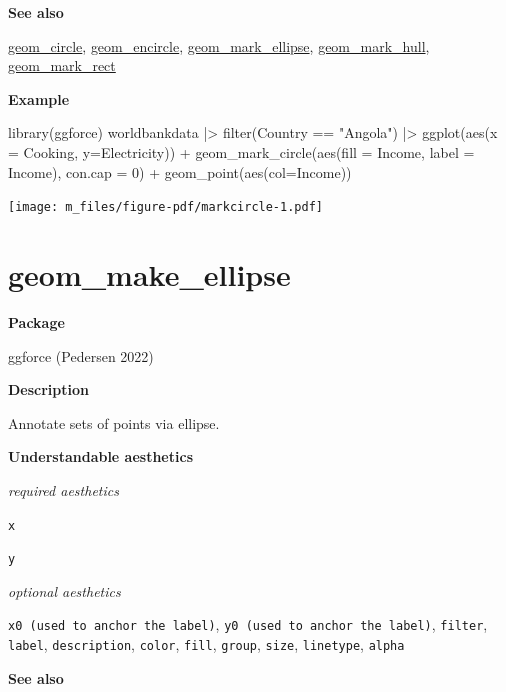 \documentclass[
  letterpaper,
  DIV=11,
  numbers=noendperiod]{scrreprt}
\newenvironment{Shaded}{\begin{snugshade}}{\end{snugshade}}
\newcommand{\AttributeTok}[1]{\textcolor[rgb]{0.40,0.45,0.13}{#1}}
\newcommand{\DecValTok}[1]{\textcolor[rgb]{0.68,0.00,0.00}{#1}}
\newcommand{\FunctionTok}[1]{\textcolor[rgb]{0.28,0.35,0.67}{#1}}
\newcommand{\NormalTok}[1]{\textcolor[rgb]{0.00,0.23,0.31}{#1}}
\newcommand{\SpecialCharTok}[1]{\textcolor[rgb]{0.37,0.37,0.37}{#1}}
\newcommand{\StringTok}[1]{\textcolor[rgb]{0.13,0.47,0.30}{#1}}
\begin{document}
\textbf{See also}

\hyperref[circle]{geom\_circle}, \hyperref[encircle]{geom\_encircle},
\hyperref[mark_ellipse]{geom\_mark\_ellipse},
\hyperref[mark_hill]{geom\_mark\_hull},
\hyperref[mark_rect]{geom\_mark\_rect}

\textbf{Example}

\begin{Shaded}
\begin{Highlighting}[]
\FunctionTok{library}\NormalTok{(ggforce)}
\NormalTok{worldbankdata }\SpecialCharTok{|\textgreater{}}
  \FunctionTok{filter}\NormalTok{(Country }\SpecialCharTok{==} \StringTok{"Angola"}\NormalTok{) }\SpecialCharTok{|\textgreater{}}
  \FunctionTok{ggplot}\NormalTok{(}\FunctionTok{aes}\NormalTok{(}\AttributeTok{x =}\NormalTok{ Cooking, }\AttributeTok{y=}\NormalTok{Electricity)) }\SpecialCharTok{+}
  \FunctionTok{geom\_mark\_circle}\NormalTok{(}\FunctionTok{aes}\NormalTok{(}\AttributeTok{fill =}\NormalTok{ Income, }\AttributeTok{label =}\NormalTok{ Income),}
                   \AttributeTok{con.cap =} \DecValTok{0}\NormalTok{) }\SpecialCharTok{+}
  \FunctionTok{geom\_point}\NormalTok{(}\FunctionTok{aes}\NormalTok{(}\AttributeTok{col=}\NormalTok{Income))}
\end{Highlighting}
\end{Shaded}

\texttt{[image: m\_files/figure-pdf/markcircle-1.pdf]}

\section{geom\_make\_ellipse}\label{mark_ellipse}

\textbf{Package}

ggforce (Pedersen 2022)

\textbf{Description}

Annotate sets of points via ellipse.

\textbf{Understandable aesthetics}

\emph{required aesthetics}

\texttt{x}

\texttt{y}

\emph{optional aesthetics}

\texttt{x0\ (used\ to\ anchor\ the\ label)},
\texttt{y0\ (used\ to\ anchor\ the\ label)}, \texttt{filter},
\texttt{label}, \texttt{description}, \texttt{color}, \texttt{fill},
\texttt{group}, \texttt{size}, \texttt{linetype}, \texttt{alpha}

\textbf{See also}
\end{document}
